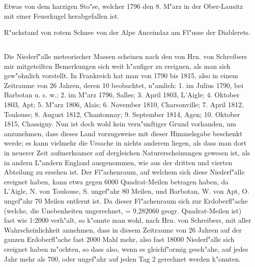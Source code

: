 \documentclass[a4paper, 11pt, oneside, polutonikogreek, german]{article}
\begin{document}
\subsubsection*{}
\paragraph{}
Etwas von dem harzigen Sto"se, welcher 1796 den 8. M"arz in der Ober-Lausitz mit einer Feuerkugel herabgefallen ist.

R"uckstand von rotem Schnee von der Alpe Anceindaz am Fl"usse der Diablerets.
\subsection{}
\paragraph{}
Die Niederf"alle meteorischer Massen scheinen nach den von Hrn. von Schreibers mir mitgeteilten Bemerkungen sich weit h"aufiger zu ereignen, als man sich gew"ohnlich vorstellt. In Frankreich hat man von 1790 bis 1815, also in einem Zeitraume von 26 Jahren, deren 10 beobachtet, n"amlich: 1. im Julius 1790, bei Barbotan u. s. w.; 2. im M"arz 1796, Salles; 3. April 1803, L'Aigle; 4. Oktober 1803, Apt; 5. M"arz 1806, Alais; 6. November 1810, Charsonville; 7. April 1812, Toulouse; 8. August 1812, Chantonnay; 9. September 1814, Agen; 10. Oktober 1815, Chassigny. Nun ist doch wohl kein vern"unftiger Grund vorhanden, um anzunehmen, dass dieses Land vorzugsweise mit dieser Himmelsgabe beschenkt werde; es kann vielmehr die Ursache in nichts anderem liegen, als dass man dort in neuerer Zeit aufmerksamer auf dergleichen Naturerscheinungen gewesen ist, als in andern L"andern England ausgenommen, wie aus der dritten und vierten Abteilung zu ersehen ist. Der Fl"achenraum, auf welchem sich diese Niederf"alle ereignet haben, kann etwa gegen 6000 Quadrat-Meilen betragen haben, da L'Aigle, N. von Toulouse, S. ungef"ahr 80 Meilen, und Barbotan, W. von Apt, O. ungef"ahr 70 Meilen entfernt ist. Da dieser Fl"achenraum sich zur Erdoberfl"ache (welche, die Unebenheiten ungerechnet, = 9,282060 geogr. Quadrat-Meilen ist) fast wie 1:2000 verh"alt, so k"onnte man wohl, nach Hrn. von Schreibers, mit aller Wahrscheinlichkeit annehmen, dass in diesem Zeitraume von 26 Jahren auf der ganzen Erdoberfl"ache fast 2000 Mahl mehr, also fast 18000 Niederf"alle sich ereignet haben m"ochten, so dass also, wenn es gleichf"ormig gesch"ahe, auf jedes Jahr mehr als 700, oder ungef"ahr auf jeden Tag 2 gerechnet werden k"onnten.
\end{document}
